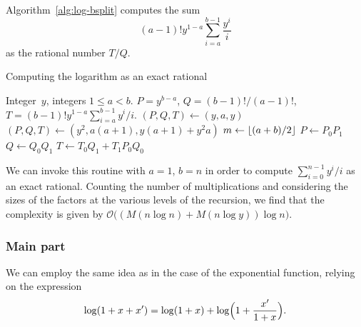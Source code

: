 Algorithm~\ref{alg:log-bsplit} computes the sum 
\begin{equation}
(a-1)! y^{1-a} \sum_{i=a}^{b-1} \frac{y^i}{i}
\end{equation}
as the rational number $T/Q$.

\begin{algorithm}
\caption{Computing the  logarithm as an exact rational}
\label{alg:log-bsplit}
\begin{algorithmic}
\vspace{1mm}
\Require Integer~$y$, integers $1 \leq a < b$.
\Ensure  $P = y^{b-a}$, $Q = (b-1)! / (a-1)!$, $T = (b-1)! y^{1-a} \sum_{i=a}^{b-1} y^i / i$.
\State $(P, Q, T) \gets (y, a, y)$
\State $(P, Q, T) \gets (y^2, a (a + 1), y (a + 1) + y^2 a)$
\Else
\State $m \gets \left\lfloor(a + b) / 2\right\rfloor$
\State {}
\State {}
\State $P \gets P_0 P_1$
\State $Q \gets Q_0 Q_1$
\State $T \gets T_0 Q_1 + T_1 P_0 Q_0$
\EndIf
\EndProcedure
\end{algorithmic}
\end{algorithm}

We can invoke this routine with $a = 1$, $b = n$ in order to compute 
$\sum_{i=0}^{n-1} y^i / i$ as an exact rational.  Counting the 
number of multiplications and considering the sizes of the factors 
at the various levels of the recursion, we find that the complexity 
is given by $\mathcal{O}\bigl((M(n \log n) + M(n \log y) )\log n\bigr)$.

\subsubsection{Main part}

We can employ the same idea as in the case of the exponential 
function, relying on the expression 
\begin{equation}
\log(1 + x + x') = \log(1 + x) + \log \Bigl(1 + \frac{x'}{1+x}\Bigr).
\end{equation}

